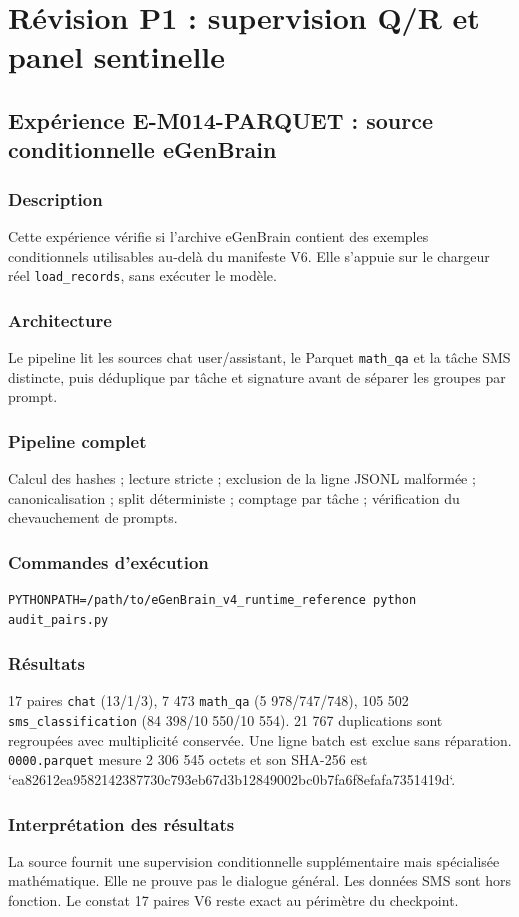 \documentclass[11pt,a4paper]{report}
\begin{document}
\chapter[Révision P1 — supervision Q/R]{Révision P1 : supervision Q/R et panel sentinelle}

\section{Expérience E-M014-PARQUET : source conditionnelle eGenBrain}
\subsection{Description}
Cette expérience vérifie si l'archive eGenBrain contient des exemples conditionnels utilisables au-delà du manifeste V6. Elle s'appuie sur le chargeur réel \texttt{load\_records}, sans exécuter le modèle.
\subsection{Architecture}
Le pipeline lit les sources chat user/assistant, le Parquet \texttt{math\_qa} et la tâche SMS distincte, puis déduplique par tâche et signature avant de séparer les groupes par prompt.
\subsection{Pipeline complet}
Calcul des hashes ; lecture stricte ; exclusion de la ligne JSONL malformée ; canonicalisation ; split déterministe ; comptage par tâche ; vérification du chevauchement de prompts.
\subsection{Commandes d'exécution}
\begin{verbatim}
PYTHONPATH=/path/to/eGenBrain_v4_runtime_reference python audit_pairs.py
\end{verbatim}
\subsection{Résultats}
17 paires \texttt{chat} (13/1/3), 7 473 \texttt{math\_qa} (5 978/747/748), 105 502 \texttt{sms\_classification} (84 398/10 550/10 554). 21 767 duplications sont regroupées avec multiplicité conservée. Une ligne batch est exclue sans réparation. \texttt{0000.parquet} mesure 2 306 545 octets et son SHA-256 est `ea82612ea9582142387730c793eb67d3b12849002bc0b7fa6f8efafa7351419d`.
\subsection{Interprétation des résultats}
La source fournit une supervision conditionnelle supplémentaire mais spécialisée mathématique. Elle ne prouve pas le dialogue général. Les données SMS sont hors fonction. Le constat 17 paires V6 reste exact au périmètre du checkpoint.
\end{document}
